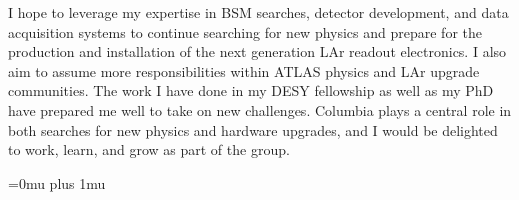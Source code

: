 \documentclass[a4paper]{article}
\begin{document}

I hope to leverage my expertise in BSM searches, detector development, and data acquisition systems to continue searching for new physics and
prepare for the production and installation of the next generation LAr readout electronics.
I also aim to assume more responsibilities within ATLAS physics and LAr upgrade communities. The work I have done
in my DESY fellowship as well as my PhD have prepared me well to take on new challenges.
Columbia plays a central role in both searches for new physics and hardware upgrades, and I would be delighted to work,
learn, and grow as part of the group.




\Urlmuskip=0mu plus 1mu\relax
{%
\fontsize{11}{14}
\selectfont
}{}

\end{document}
